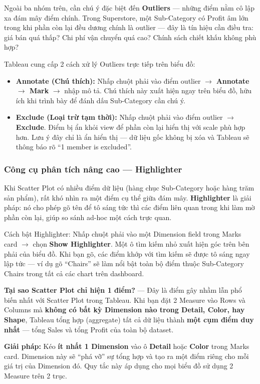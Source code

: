 \documentclass[12pt]{article}
\begin{document}
\noindent Ngoài ba nhóm trên, cần chú ý đặc biệt đến \textbf{Outliers} --- những điểm nằm cô lập xa đám mây điểm chính. Trong Superstore, một Sub-Category có Profit âm lớn trong khi phần còn lại đều dương chính là outlier --- đây là tín hiệu cần điều tra: giá bán quá thấp? Chi phí vận chuyển quá cao? Chính sách chiết khấu không phù hợp?

\noindent Tableau cung cấp 2 cách xử lý Outliers trực tiếp trên biểu đồ:
\begin{itemize}[nosep]
    \item \textbf{Annotate (Chú thích):} Nhấp chuột phải vào điểm outlier $\rightarrow$ \textbf{Annotate $\rightarrow$ Mark} $\rightarrow$ nhập mô tả. Chú thích này xuất hiện ngay trên biểu đồ, hữu ích khi trình bày để đánh dấu Sub-Category cần chú ý.
    \item \textbf{Exclude (Loại trừ tạm thời):} Nhấp chuột phải vào điểm outlier $\rightarrow$ \textbf{Exclude}. Điểm bị ẩn khỏi view để phần còn lại hiển thị với scale phù hợp hơn. Lưu ý đây chỉ là ẩn hiển thị --- dữ liệu gốc không bị xóa và Tableau sẽ thông báo rõ ``1 member is excluded''.
\end{itemize}

\subsubsection{Công cụ phân tích nâng cao --- Highlighter}

\noindent Khi Scatter Plot có nhiều điểm dữ liệu (hàng chục Sub-Category hoặc hàng trăm sản phẩm), rất khó nhìn ra một điểm cụ thể giữa đám mây. \textbf{Highlighter} là giải pháp: nó cho phép gõ tên để tô sáng tức thì các điểm liên quan trong khi làm mờ phần còn lại, giúp so sánh ad-hoc một cách trực quan.

\noindent Cách bật Highlighter: Nhấp chuột phải vào một Dimension field trong Marks card $\rightarrow$ chọn \textbf{Show Highlighter}. Một ô tìm kiếm nhỏ xuất hiện góc trên bên phải của biểu đồ. Khi bạn gõ, các điểm khớp với tìm kiếm sẽ được tô sáng ngay lập tức --- ví dụ gõ ``Chairs'' sẽ làm nổi bật toàn bộ điểm thuộc Sub-Category Chairs trong tất cả các chart trên dashboard.

\begin{notebox}
\textbf{Tại sao Scatter Plot chỉ hiện 1 điểm?} --- Đây là điểm gây nhầm lẫn phổ biến nhất với Scatter Plot trong Tableau. Khi bạn đặt 2 Measure vào Rows và Columns mà \textbf{không có bất kỳ Dimension nào trong Detail, Color, hay Shape}, Tableau tổng hợp (aggregate) tất cả dữ liệu thành \textbf{một cụm điểm duy nhất} --- tổng Sales và tổng Profit của toàn bộ dataset.

\noindent \textbf{Giải pháp:} Kéo \textbf{ít nhất 1 Dimension} vào ô \textbf{Detail} hoặc \textbf{Color} trong Marks card. Dimension này sẽ ``phá vỡ'' sự tổng hợp và tạo ra một điểm riêng cho mỗi giá trị của Dimension đó. Quy tắc này áp dụng cho mọi biểu đồ sử dụng 2 Measure trên 2 trục.
\end{notebox}
\end{document}
